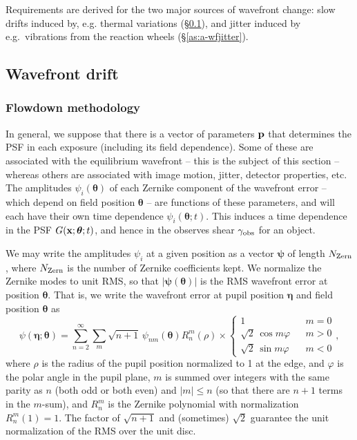 \documentclass[aps,prd, amsmath,amssymb,superscriptaddress,showkeys,nofootinbib,reprint,preprintnumbers]{revtex4-1}
\begin{document}
\begin{widetext}
Requirements are derived for the two major sources of wavefront change: slow drifts induced by, e.g. thermal variations (\S\ref{as:a-drift}), and jitter induced by e.g.\ vibrations from the reaction wheels (\S\ref{as:a-wfjitter}).

\subsection{Wavefront drift}
\label{as:a-drift}

\subsubsection{Flowdown methodology}
\label{as:drift-method}

In general, we suppose that there is a vector of parameters ${\bf p}$
that determines the PSF in each exposure (including its field
dependence). Some of these are associated with the equilibrium
wavefront -- this is the subject of this section -- whereas others are
associated with image motion, jitter, detector properties, etc. The
amplitudes $\psi_i({\boldsymbol\theta})$ of each Zernike component of
the wavefront error -- which depend on field position
${\boldsymbol\theta}$ -- are functions of these parameters, and will
each have their own time dependence
$\psi_i({\boldsymbol\theta};t)$. This induces a time dependence in the
PSF $G({\bf x};{\boldsymbol\theta};t)$, and hence in the observes
shear $\gamma_{\rm obs}$ for an object.

We may write the amplitudes $\psi_i$ at a given position as a vector
${\boldsymbol\psi}$ of length $N_{\rm Zern}$, where $N_{\rm Zern}$ is
the number of Zernike coefficients kept. We normalize the Zernike
modes to unit RMS, so that $|{\boldsymbol\psi}({\boldsymbol\theta})|$
is the RMS wavefront error at position ${\boldsymbol\theta}$. That is,
we write the wavefront error at pupil position ${\boldsymbol\eta}$ and
field position ${\boldsymbol\theta}$ as
\begin{equation}
\psi({\boldsymbol\eta};{\boldsymbol\theta}) = \sum_{n=2}^\infty
\sum_{m} \sqrt{n+1}\,\psi_{nm}({\boldsymbol\theta}) R_n^m(\rho)
\times\left\{\begin{array}{ccc} 1 & & m=0 \\ \sqrt2\,\cos m\varphi & &
m>0 \\ \sqrt2\,\sin m\varphi & & m<0 \end{array} \right.,
\end{equation}
where $\rho$ is the radius of the pupil position normalized to 1 at
the edge, and $\varphi$ is the polar angle in the pupil plane, $m$ is
summed over integers with the same parity as $n$ (both odd or both
even) and $|m|\le n$ (so that there are $n+1$ terms in the $m$-sum),
and $R_n^m$ is the Zernike polynomial with normalization
$R_n^m(1)=1$. The factor of $\sqrt{n+1}$ and (sometimes) $\sqrt2$
guarantee the unit normalization of the RMS over the unit disc.


\end{widetext}
\end{document}
